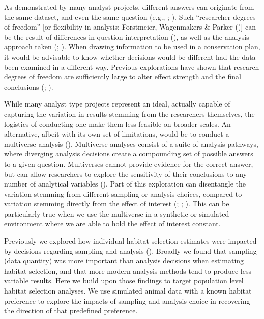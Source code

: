 \documentclass[10pt,a4paper]{article}
\begin{document}
As demonstrated by many analyst projects, different answers can originate from the same dataset, and even the same question (e.g., ; ).
Such ``researcher degrees of freedom'' {[}or flexibility in analysis; Forstmeier, Wagenmakers \& Parker (){]} can be the result of differences in question interpretation (), as well as the analysis approach taken (; ).
When drawing information to be used in a conservation plan, it would be advisable to know whether decisions would be different had the data been examined in a different way.
Previous explorations have shown that research degrees of freedom are sufficiently large to alter effect strength and the final conclusions (; ).

While many analyst type projects represent an ideal, actually capable of capturing the variation in results stemming from the researchers themselves, the logistics of conducting one make them less feasible on broader scales.
An alternative, albeit with its own set of limitations, would be to conduct a multiverse analysis ().
Multiverse analyses consist of a suite of analysis pathways, where diverging analysis decisions create a compounding set of possible answers to a given question.
Multiverses cannot provide evidence for the correct answer, but can allow researchers to explore the sensitivity of their conclusions to any number of analytical variables ().
Part of this exploration can disentangle the variation stemming from different sampling or analysis choices, compared to variation stemming directly from the effect of interest (; ; ).
This can be particularly true when we use the multiverse in a synthetic or simulated environment where we are able to hold the effect of interest constant.

Previously we explored how individual habitat selection estimates were impacted by decisions regarding sampling and analysis ().
Broadly we found that sampling (data quantity) was more important than analysis decisions when estimating habitat selection, and that more modern analysis methods tend to produce less variable results.
Here we build upon those findings to target population level habitat selection analyses. We use simulated animal data with a known habitat preference to explore the impacts of sampling and analysis choice in recovering the direction of that predefined preference.
\end{document}
